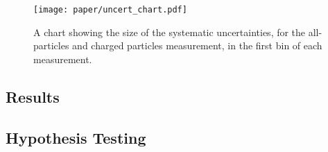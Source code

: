 

\begin{figure}[htbp]
  \centering
    \texttt{[image: paper/uncert\_chart.pdf]}
  \caption{A chart showing the size of the systematic uncertainties, for the all-particles and charged particles measurement, in the first bin of each measurement.}
  \label{fig:color:unfolding:uncert_chart}
\end{figure}






	\subsection{Results}

	\subsection{Hypothesis Testing}
		